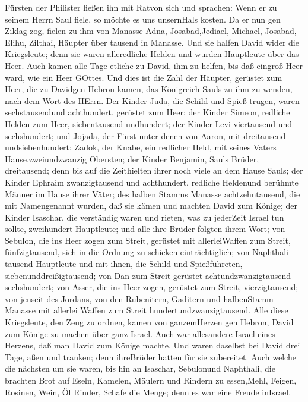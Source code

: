 Fürsten der Philister ließen ihn mit Ratvon sich und sprachen: Wenn er
zu seinem Herrn Saul fiele, so möchte es uns unsernHals kosten.
 Da er nun gen Ziklag zog, fielen zu ihm von Manasse Adna,
Josabad,Jediael, Michael, Josabad, Elihu, Zilthai, Häupter über tausend
in Manasse.  Und sie halfen David wider die Kriegsleute;
denn sie waren alleredliche Helden und wurden Hauptleute über das Heer.
 Auch kamen alle Tage etliche zu David, ihm zu helfen, bis
daß eingroß Heer ward, wie ein Heer GOttes.  Und dies ist
die Zahl der Häupter, gerüstet zum Heer, die zu Davidgen Hebron kamen,
das Königreich Sauls zu ihm zu wenden, nach dem Wort des HErrn.
 Der Kinder Juda, die Schild und Spieß trugen, waren
sechstausendund achthundert, gerüstet zum Heer;  der Kinder
Simeon, redliche Helden zum Heer, siebentausend undhundert;
 der Kinder Levi viertausend und sechshundert;
 und Jojada, der Fürst unter denen von Aaron, mit
dreitausend undsiebenhundert;  Zadok, der Knabe, ein
redlicher Held, mit seines Vaters Hause,zweiundzwanzig Obersten;
 der Kinder Benjamin, Sauls Brüder, dreitausend; denn bis
auf die Zeithielten ihrer noch viele an dem Hause Sauls; 
der Kinder Ephraim zwanzigtausend und achthundert, redliche Heldenund
berühmte Männer im Hause ihrer Väter;  des halben Stamms
Manasse achtzehntausend, die mit Namengenannt wurden, daß sie kämen und
machten David zum Könige;  der Kinder Isaschar, die
verständig waren und rieten, was zu jederZeit Israel tun sollte,
zweihundert Hauptleute; und alle ihre Brüder folgten ihrem Wort;
 von Sebulon, die ins Heer zogen zum Streit, gerüstet mit
allerleiWaffen zum Streit, fünfzigtausend, sich in die Ordnung zu
schicken einträchtiglich;  von Naphthali tausend Hauptleute
und mit ihnen, die Schild und Spießführeten, siebenunddreißigtausend;
 von Dan zum Streit gerüstet achtundzwanzigtausend
sechshundert;  von Asser, die ins Heer zogen, gerüstet zum
Streit, vierzigtausend;  von jenseit des Jordans, von den
Rubenitern, Gaditern und halbenStamm Manasse mit allerlei Waffen zum
Streit hundertundzwanzigtausend.  Alle diese Kriegsleute,
den Zeug zu ordnen, kamen von ganzemHerzen gen Hebron, David zum Könige
zu machen über ganz Israel. Auch war allesandere Israel eines Herzens,
daß man David zum Könige machte.  Und waren daselbst bei
David drei Tage, aßen und tranken; denn ihreBrüder hatten für sie
zubereitet.  Auch welche die nächsten um sie waren, bis hin
an Isaschar, Sebulonund Naphthali, die brachten Brot auf Eseln, Kamelen,
Mäulern und Rindern zu essen,Mehl, Feigen, Rosinen, Wein, Öl Rinder,
Schafe die Menge; denn es war eine Freude inIsrael.


